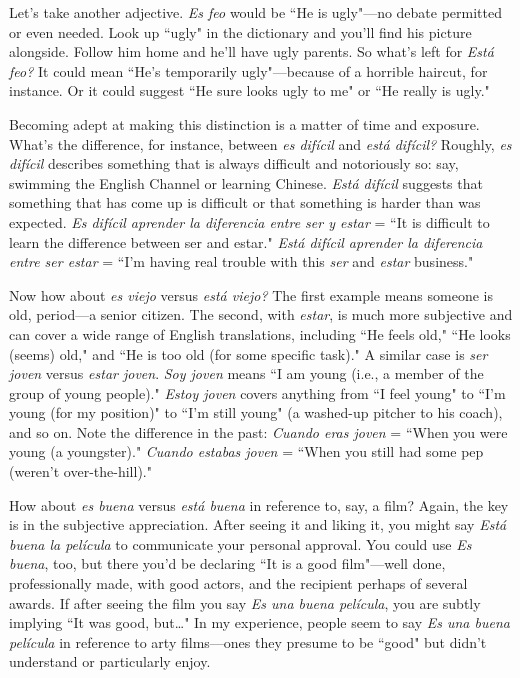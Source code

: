Let's take another adjective. \emph{Es feo} would be ``He is ugly"---no
debate permitted or even needed. Look up ``ugly" in the dictionary and
you'll find his picture alongside. Follow him home and he'll have ugly
parents. So what's left for \emph{Está feo?} It could mean ``He's temporarily
ugly"---because of a horrible haircut, for instance. Or it could suggest
``He sure looks ugly to me" or ``He really is ugly."

Becoming adept at making this distinction is a matter of time
and exposure. What's the difference, for instance, between \emph{es difícil}
and \emph{está difícil?} Roughly, \emph{es difícil} describes something that is always
difficult and notoriously so: say, swimming the English Channel or
learning Chinese. \emph{Está difícil} suggests that something that has come
up is difficult or that something is harder than was expected. \emph{Es difícil aprender la diferencia entre ser y estar}
= ``It is difficult to learn the
difference between ser and estar." \emph{Está difícil aprender la diferencia
	entre ser estar} = ``I'm having real trouble with this \emph{ser} and \emph{estar}
business."

Now how about \emph{es viejo} versus \emph{está viejo?} The first example
means someone is old, period---a senior citizen. The second, with
\emph{estar}, is much more subjective and can cover a wide range of English
translations, including ``He feels old," ``He looks (seems) old," and
``He is too old (for some specific task)." A similar case is \emph{ser joven}
versus \emph{estar joven}. \emph{Soy joven} means ``I am young (i.e., a member
of the group of young people)." \emph{Estoy joven} covers anything from ``I
feel young" to ``I'm young (for my position)" to ``I'm still young" (a
washed-up pitcher to his coach), and so on. Note the difference in the
past: \emph{Cuando eras joven} = ``When you were young (a youngster)."
\emph{Cuando estabas joven} = ``When you still had some pep (weren't over-the-hill)."

How about \emph{es buena} versus \emph{está buena} in reference to, say, a
film? Again, the key is in the subjective appreciation. After seeing it
and liking it, you might say \emph{Está buena la película} to communicate
your personal approval. You could use \emph{Es buena}, too, but there you'd
be declaring ``It is a good film"---well done, professionally made, with
good actors, and the recipient perhaps of several awards. If after seeing
the film you say \emph{Es una buena película}, you are subtly implying ``It
was good, but\ldots{}" In my experience, people seem to say \emph{Es una
	buena película} in reference to arty films---ones they presume to be
``good" but didn't understand or particularly enjoy.

